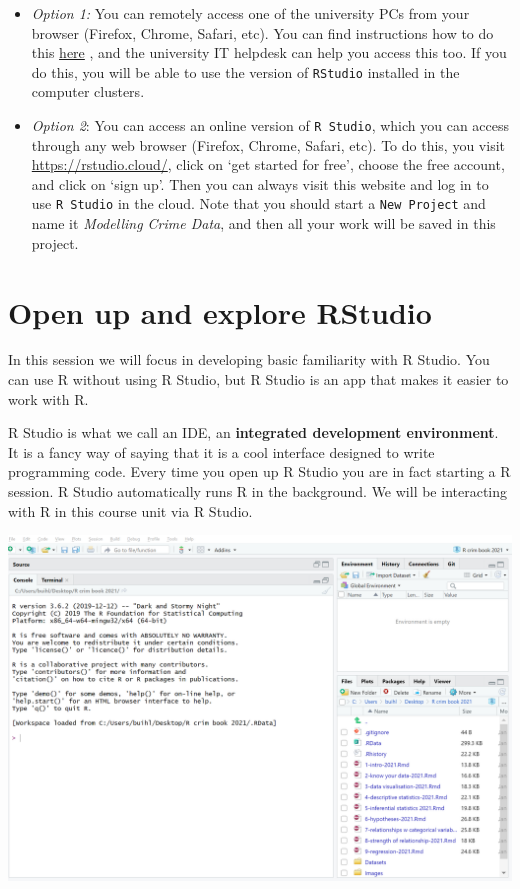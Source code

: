 \documentclass[
]{book}
\begin{document}
\begin{itemize}
\item
  \emph{Option 1:} You can remotely access one of the university PCs from your browser (Firefox, Chrome, Safari, etc). You can find instructions how to do this \href{https://www.itservices.manchester.ac.uk/students/pc-on-campus/remote-cluster-access/}{here} , and the university IT helpdesk can help you access this too. If you do this, you will be able to use the version of \texttt{RStudio} installed in the computer clusters.
\item
  \emph{Option 2}: You can access an online version of \texttt{R\ Studio}, which you can access through any web browser (Firefox, Chrome, Safari, etc). To do this, you visit \url{https://rstudio.cloud/}, click on `get started for free', choose the free account, and click on `sign up'. Then you can always visit this website and log in to use \texttt{R\ Studio} in the cloud. Note that you should start a \texttt{New\ Project} and name it \emph{Modelling Crime Data}, and then all your work will be saved in this project.
\end{itemize}

\hypertarget{open-up-and-explore-rstudio}{%
\section{Open up and explore RStudio}\label{open-up-and-explore-rstudio}}

In this session we will focus in developing basic familiarity with R Studio. You can use R without using R Studio, but R Studio is an app that makes it easier to work with R.

R Studio is what we call an IDE, an \textbf{integrated development environment}. It is a fancy way of saying that it is a cool interface designed to write programming code. Every time you open up R Studio you are in fact starting a R session. R Studio automatically runs R in the background. We will be interacting with R in this course unit via R Studio.

\includegraphics{img/rstudio.png}
\end{document}

